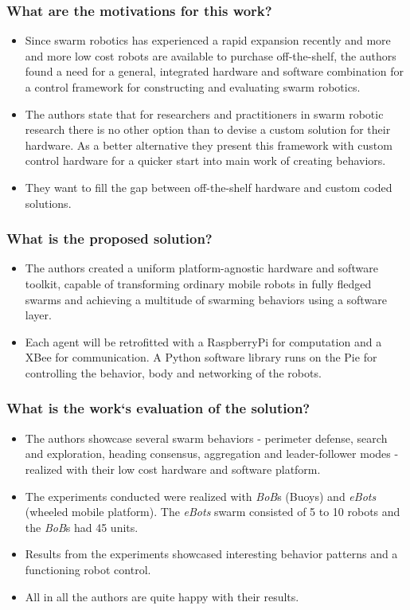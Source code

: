     
     
    \subsubsection*{What are the motivations for this work?}
    \begin{itemize}
        \item Since swarm robotics has experienced a rapid expansion recently and more and more low cost robots are available to purchase off-the-shelf, the authors found a need for a general, integrated hardware and software combination for a control framework for constructing and evaluating swarm robotics.
        \item The authors state that for researchers and practitioners in swarm robotic research there is no other option than to devise a custom solution for their hardware. As a better alternative they present this framework with custom control hardware for a quicker start into main work of creating behaviors.
        \item They want to fill the gap between off-the-shelf hardware and custom coded solutions.
    \end{itemize}
    \subsubsection*{What is the proposed solution?}
    \begin{itemize}
        \item The authors created a uniform platform-agnostic hardware and software toolkit, capable of transforming ordinary mobile robots in fully fledged swarms and achieving a multitude of swarming behaviors using a software layer.
        \item Each agent will be retrofitted with a RaspberryPi for computation and a XBee for communication. A Python software library runs on the Pie for controlling the behavior, body and networking of the robots.
    \end{itemize}
    \subsubsection*{What is the work`s evaluation of the solution?}
    \begin{itemize}
        \item The authors showcase several swarm behaviors - perimeter defense, search and exploration, heading consensus, aggregation and leader-follower modes - realized with their low cost hardware and software platform.
        \item The experiments conducted were realized with \emph{BoB}s (Buoys) and \emph{eBots} (wheeled mobile platform). The \emph{eBots} swarm consisted of 5 to 10 robots and the \emph{BoB}s  had 45 units. 
        \item Results from the experiments showcased interesting behavior patterns and a functioning robot control.
        \item All in all the authors are quite happy with their results.
    \end{itemize}
